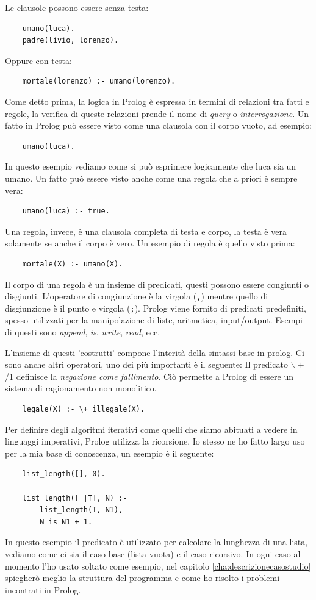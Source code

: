Le clausole possono essere senza testa:
\begin{verbatim}
    umano(luca).
    padre(livio, lorenzo).
\end{verbatim}
Oppure con testa:
\begin{verbatim}
    mortale(lorenzo) :- umano(lorenzo).
\end{verbatim}

Come detto prima, la logica in Prolog è espressa in termini di relazioni tra fatti e regole, la verifica di queste relazioni
prende il nome di \textit{query} o \textit{interrogazione}.
Un fatto in Prolog può essere visto come una clausola con il corpo vuoto, ad esempio:
\begin{verbatim}
    umano(luca).
\end{verbatim}
In questo esempio vediamo come si può esprimere logicamente che luca sia un umano.
Un fatto può essere visto anche come una regola che a priori è sempre vera:
\begin{verbatim}
    umano(luca) :- true.
\end{verbatim}
Una regola, invece, è una clausola completa di testa e corpo, la testa è vera solamente se anche il corpo è vero.
Un esempio di regola è quello visto prima:
\begin{verbatim}
    mortale(X) :- umano(X).
\end{verbatim}

Il corpo di una regola è un insieme di predicati, questi possono essere congiunti o disgiunti. L'operatore di congiunzione è la
virgola (\verb+,+) mentre quello di disgiunzione è il punto e virgola (\verb+;+). Prolog viene fornito di predicati predefiniti, spesso
utilizzati per la manipolazione di liste, aritmetica, input/output. Esempi di questi sono \textit{append}, \textit{is}, \textit{write}, \textit{read}, ecc.

L'insieme di questi 'costrutti' compone l'interità della sintassi base in prolog. Ci sono anche altri operatori, uno dei più importanti è il seguente:
Il predicato $\backslash+$ /1 definisce la \textit{negazione come fallimento}. Ciò permette a Prolog di essere un sistema di ragionamento non monolitico.
\begin{verbatim}
    legale(X) :- \+ illegale(X).
\end{verbatim}

Per definire degli algoritmi iterativi come quelli che siamo abituati a vedere in linguaggi imperativi, Prolog utilizza la ricorsione. Io stesso ne ho fatto largo uso per la mia base di conoscenza,
un esempio è il seguente:
\begin{verbatim}
    list_length([], 0).

    list_length([_|T], N) :-
        list_length(T, N1),
        N is N1 + 1.
\end{verbatim}
In questo esempio il predicato è utilizzato per calcolare la lunghezza di una lista, vediamo come ci sia il caso base (lista vuota) e il caso ricorsivo.
In ogni caso al momento l'ho usato soltato come esempio, nel capitolo \ref{cha:descrizionecasostudio} spiegherò meglio la struttura del programma e come ho risolto i problemi incontrati in Prolog.
